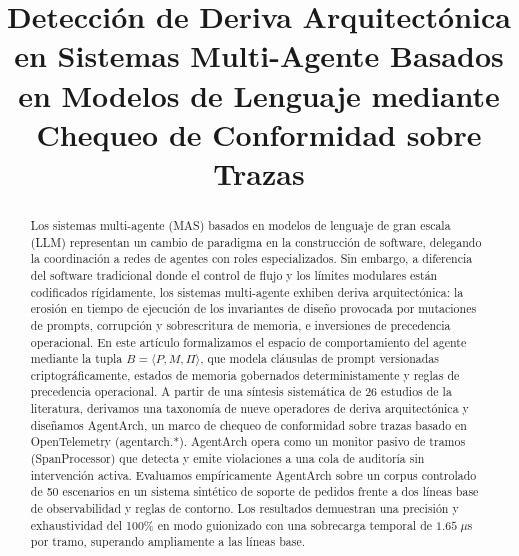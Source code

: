 \documentclass[conference]{IEEEtran}
\begin{document}
\title{Detecci\'on de Deriva Arquitect\'onica en Sistemas Multi-Agente Basados en Modelos de Lenguaje mediante Chequeo de Conformidad sobre Trazas}

\author{
\and
{}
}

\maketitle

\renewcommand\abstractname{Resumen}
\begin{abstract}
Los sistemas multi-agente (MAS) basados en modelos de lenguaje de gran escala (LLM) representan un cambio de paradigma en la construcci\'on de software, delegando la coordinaci\'on a redes de agentes con roles especializados. Sin embargo, a diferencia del software tradicional donde el control de flujo y los l\'imites modulares est\'an codificados r\'igidamente, los sistemas multi-agente exhiben deriva arquitect\'onica: la erosi\'on en tiempo de ejecuci\'on de los invariantes de dise\~no provocada por mutaciones de prompts, corrupci\'on y sobrescritura de memoria, e inversiones de precedencia operacional. En este art\'iculo formalizamos el espacio de comportamiento del agente mediante la tupla $B = \langle P, M, \Pi \rangle$, que modela cl\'ausulas de prompt versionadas criptogr\'aficamente, estados de memoria gobernados deterministamente y reglas de precedencia operacional. A partir de una s\'intesis sistem\'atica de 26 estudios de la literatura, derivamos una taxonom\'ia de nueve operadores de deriva arquitect\'onica y dise\~namos AgentArch, un marco de chequeo de conformidad sobre trazas basado en OpenTelemetry (agentarch.*). AgentArch opera como un monitor pasivo de tramos (SpanProcessor) que detecta y emite violaciones a una cola de auditor\'ia sin intervenci\'on activa. Evaluamos emp\'iricamente AgentArch sobre un corpus controlado de 50 escenarios en un sistema sint\'etico de soporte de pedidos frente a dos l\'ineas base de observabilidad y reglas de contorno. Los resultados demuestran una precisi\'on y exhaustividad del 100\% en modo guionizado con una sobrecarga temporal de $1.65\;\mu$s por tramo, superando ampliamente a las l\'ineas base.
\end{abstract}
\end{document}
